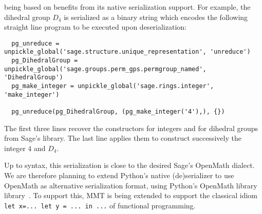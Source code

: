 \Sage being based on \Python benefits from its native serialization
support. For example, the dihedral group $D_4$ is serialized as a
binary string which encodes the following straight line program to be
executed upon deserialization:
\begin{lstlisting}
  pg_unreduce = unpickle_global('sage.structure.unique_representation', 'unreduce')
  pg_DihedralGroup = unpickle_global('sage.groups.perm_gps.permgroup_named', 'DihedralGroup')
  pg_make_integer = unpickle_global('sage.rings.integer', 'make_integer')

  pg_unreduce(pg_DihedralGroup, (pg_make_integer('4'),), {})
\end{lstlisting}
The first three lines recover the constructors for integers and for
dihedral groups from Sage's library. The last line applies them to
construct successively the integer $4$ and $D_4$.

Up to syntax, this serialization is close to the desired Sage's
OpenMath dialect.
We are therefore planning to extend Python's native (de)serializer to
use OpenMath as alternative serialization format, using Python's
OpenMath library library~\cite{py-openmath:on}. To support this, MMT
is being extended to support the classical idiom
\lstinline{let x=... let y = ... in ...}
of functional programming.

